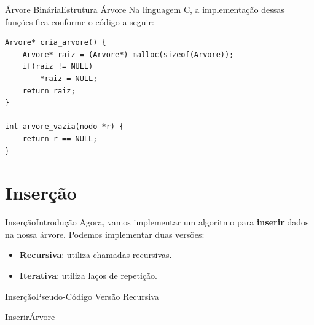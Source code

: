 \documentclass[aspectratio=169]{beamer}
\begin{document}
\begin{frame}[fragile]{Árvore Binária}{Estrutura Árvore}
Na linguagem C, a implementação dessas funções fica conforme o código a seguir:
\begin{lstlisting}[style=CStyle]
Arvore* cria_arvore() {
    Arvore* raiz = (Arvore*) malloc(sizeof(Arvore));
    if(raiz != NULL)
        *raiz = NULL;
    return raiz;   
}

int arvore_vazia(nodo *r) {
    return r == NULL;
}
\end{lstlisting}  
\end{frame}

\section{Inserção}

\begin{frame}{Inserção}{Introdução}
Agora, vamos implementar um algoritmo para {\bf inserir} dados na nossa árvore. Podemos implementar duas versões:
\begin{itemize}
 \item {\bf Recursiva}: utiliza chamadas recursivas.
 \item {\bf Iterativa}: utiliza laços de repetição.
\end{itemize}
\end{frame}


\begin{frame}{Inserção}{Pseudo-Código Versão Recursiva}
\begin{algorithm}[H]
\caption{InserirÁrvore} 
\label{InserirArvore}
\end{algorithm}
\end{frame}
\end{document}

